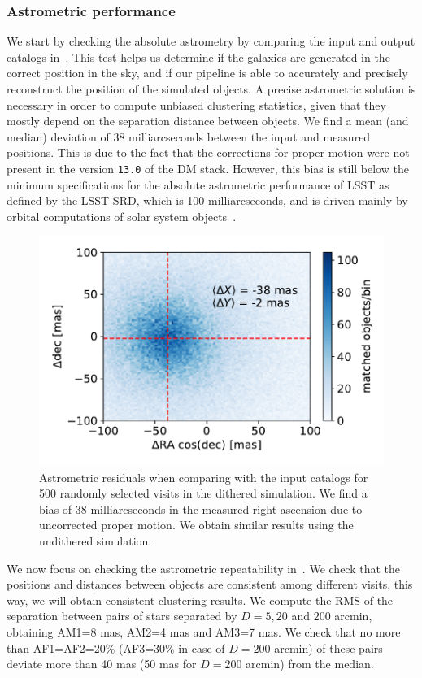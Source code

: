 \documentclass[twocolumn]{aastex62}
\begin{document}
\subsubsection{Astrometric performance}
\label{sssec:astrometry}
We start by checking the absolute astrometry by comparing the input and output catalogs in~. This test helps us determine if the galaxies are generated in the correct position in the sky, and if our pipeline is able to accurately and precisely reconstruct the position of the simulated objects. A precise astrometric solution is necessary in order to compute unbiased clustering statistics, given that they mostly depend on the separation distance between objects. We find a mean (and median) deviation of 38 milliarcseconds between the input and measured positions. This is due to the fact that the corrections for proper motion were not present in the version \texttt{13.0} of the DM stack. However, this bias is still below the minimum specifications for the absolute astrometric performance of LSST as defined by the LSST-SRD, which is 100 milliarcseconds, and is driven mainly by orbital computations of solar system objects~\citep{LPM-17}. 

\begin{figure}
\centering
\includegraphics[width=0.9\columnwidth]{astrometric_residuals_single_visit_2d}
\caption{Astrometric residuals when comparing with the input catalogs for 500 randomly selected visits in the dithered simulation. We find a bias of 38 milliarcseconds in the measured right ascension due to uncorrected proper motion. We obtain similar results using the undithered simulation.}
\label{fig:AA1}
\end{figure}

We now focus on checking the astrometric repeatability in~. We check that the positions and distances between objects are consistent among different visits, this way, we will obtain consistent clustering results. We compute the RMS of the separation between pairs of stars separated by $D=5, 20$ and $200$ arcmin, obtaining AM1=8 mas, AM2=4 mas and AM3=7 mas. We check that no more than AF1=AF2=20\% (AF3=30\% in case of $D=200$ arcmin) of these pairs deviate more than 40 mas (50 mas for $D=200$ arcmin) from the median.
\end{document}
